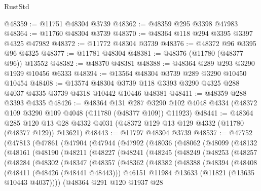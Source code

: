 \begin{lexlean}{RustStd}
\begin{coremodule}
@48359 := @11751 @48304 @3739
@48362 := @48359 @295 @3398 @47983
@48364 := @11760 @48304 @3739
@48370 := @48364 @118 @294 @3395 @3397 @4325 @47982
@48372 := @11772 @48304 @3739
@48376 := @48372 @96 @3395 @96 @4325
@48377 := @11781 @48304
@48381 := @48376 (@11780 (@48377 @96)) @13552
@48382 := @48370 @48381
@48388 := @48364 @289 @293 @3290 @1939 @10456 @6333
@48394 := @13564 @48304 @3739 @289 @3290 @10450 @10454
@48408 := @13574
    @48304
    @3739
    @118
    @3393
    @3290
    @4325
    @288
    @4037
    @4335
    @3739
    @4318
    @10442
    @10446
    @48381
@48411 := @48359 @288 @3393 @4335
@48426 := @48364
    @131
    @287
    @3290
    @102
    @4048
    @4334
    (@48372 @109 @3290 @109 @4048 (@11780 (@48377 @109)) @11923)
@48441 := @48364
    @285
    @120
    @13
    @28
    @4332
    @4031
    (@48372 @129 @13 @129 @4332 (@11780 (@48377 @129)) @13621)
@48443 := @11797 @48304 @3739
@48537 := @47752
    (@47813
      (@47861
        (@47904
          (@47944
            (@47992
              (@48036
                (@48062
                  (@48099
                    (@48132
                      (@48161
                        (@48190
                          (@48211
                            (@48227
                              (@48241
                                (@48245
                                  (@48249
                                    (@48253
                                      (@48257
                                        (@48284
                                          (@48302
                                            (@48347
                                              (@48357
                                                (@48362
                                                  (@48382
                                                    (@48388
                                                      (@48394
                                                        (@48408
                                                          (@48411 (@48426 (@48441 @48443)))
                                                          @46151
                                                          @11984
                                                          @13633
                                                          (@11821 (@13635 @10443 @4037))))
                                                      (@48364
                                                        @291
                                                        @120
                                                        @1937
                                                        @28

\end{coremodule}
\end{lexlean}

